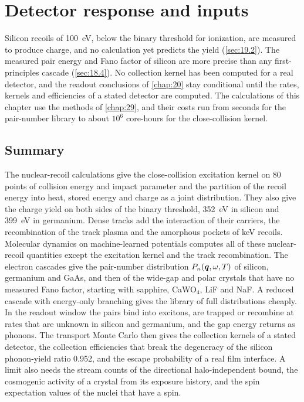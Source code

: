 \chapter{Detector response and inputs}\label{chap:32}

Silicon recoils of \SI{100}{eV}, below the binary threshold for ionization, are measured to produce charge, and no calculation yet predicts the yield (\cref{sec:19.2}). The measured pair energy and Fano factor of silicon are more precise than any first-principles cascade (\cref{sec:18.4}). No collection kernel has been computed for a real detector, and the readout conclusions of \cref{chap:20} stay conditional until the rates, kernels and efficiencies of a stated detector are computed. The calculations of this chapter use the methods of \cref{chap:29}, and their costs run from seconds for the pair-number library to about $10^6$ core-hours for the close-collision kernel.






\section*{Summary}

The nuclear-recoil calculations give the close-collision excitation kernel on 80 points of collision energy and impact parameter and the partition of the recoil energy into heat, stored energy and charge as a joint distribution. They also give the charge yield on both sides of the binary threshold, \SI{352}{eV} in silicon and \SI{399}{eV} in germanium. Dense tracks add the interaction of their carriers, the recombination of the track plasma and the amorphous pockets of keV recoils. Molecular dynamics on machine-learned potentials computes all of these nuclear-recoil quantities except the excitation kernel and the track recombination. The electron cascades give the pair-number distribution $P_n(\bm{q},\omega,T)$ of silicon, germanium and GaAs, and then of the wide-gap and polar crystals that have no measured Fano factor, starting with sapphire, CaWO$_4$, LiF and NaF. A reduced cascade with energy-only branching gives the library of full distributions cheaply. In the readout window the pairs bind into excitons, are trapped or recombine at rates that are unknown in silicon and germanium, and the gap energy returns as phonons. The transport Monte Carlo then gives the collection kernels of a stated detector, the collection efficiencies that break the degeneracy of the silicon phonon-yield ratio 0.952, and the escape probability of a real film interface. A limit also needs the stream counts of the directional halo-independent bound, the cosmogenic activity of a crystal from its exposure history, and the spin expectation values of the nuclei that have a spin.

\printbibliography[heading=subbibliography]
